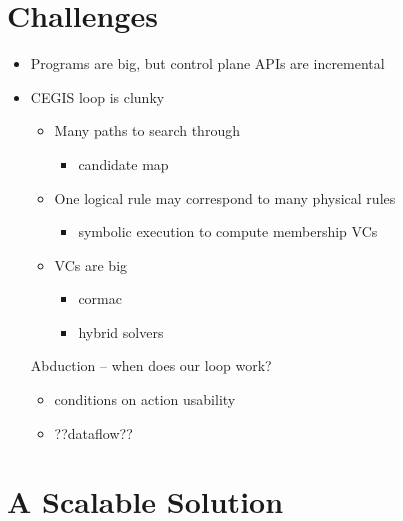 

  
\section{Challenges}
\begin{itemize}
\item Programs are big, but control plane APIs are incremental
\item CEGIS loop is clunky
  \begin{itemize}
  \item Many paths to search through
    \begin{itemize} \item candidate map \end{itemize}
  \item One logical rule may correspond to many physical rules
    \begin{itemize} \item symbolic execution to compute membership VCs \end{itemize}
  \item VCs are big
    \begin{itemize}
    \item cormac
    \item hybrid solvers
    \end{itemize}
  \end{itemize}
Abduction -- when does our loop work?
  \begin{itemize}
  \item conditions on action usability
  \item ??dataflow??
  \end{itemize}
\end{itemize}

\section{A Scalable Solution}

